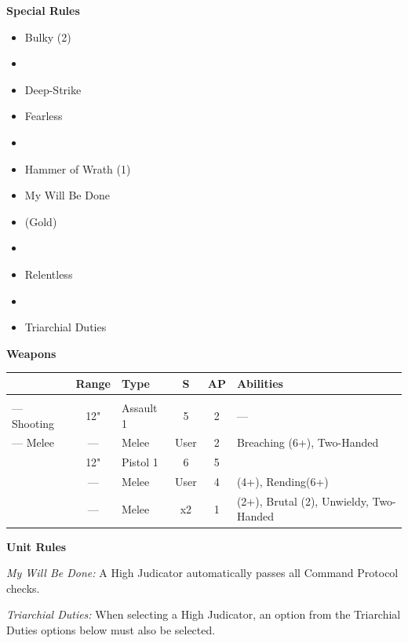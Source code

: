\begin{minipage}[t]{0.72\textwidth}
\begin{minipage}[t]{0.5\textwidth}
\begin{flushleft}
			\textbf{Special Rules}
			\begin{itemize}
				\item Bulky (2)
				\item {}
				\item Deep-Strike
				\item Fearless
				\item {}
				\item Hammer of Wrath (1)
				\item My Will Be Done
				\item {} (Gold)
				\item {}
				\item Relentless
				\item {}
				\item Triarchial Duties
			\end{itemize}
		\end{flushleft}
	\end{minipage}
	
	\vspace*{2em}
	\textbf{Weapons}
	
	\begin{tabular}{L{90 pt} c C{40pt} *{2}{c} >{\raggedright\arraybackslash}p{130pt}}
		& Range & Type & S & AP & Abilities \\
		\hline
		 &  &  &  &  & \\
		— Shooting & 12" & Assault 1 & 5 & 2 & — \\
		— Melee & — & Melee & User & 2 & Breaching (6+), Two-Handed \\
		 & 12" & Pistol 1 & 6 & 5 & \\
		 & — & Melee & User & 4 &  (4+), Rending(6+) \\
		 & — & Melee & x2 & 1 &  (2+), Brutal (2), Unwieldy, Two-Handed \\
	\end{tabular}
	
	\vspace*{2em}
	\textbf{Unit Rules}
	
	\textit{My Will Be Done:} A High Judicator automatically passes all Command Protocol checks.
	
	\textit{Triarchial Duties:} When selecting a High Judicator, an option from the Triarchial Duties options below must also be selected.
	

\end{minipage}
